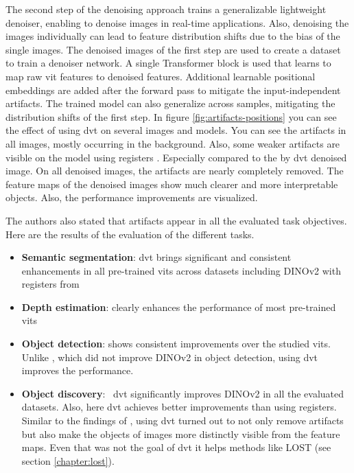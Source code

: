 \documentclass[conference]{IEEEtran}
\begin{document}
  The second step of the denoising approach trains a generalizable lightweight denoiser, enabling to denoise images in real-time applications. Also, denoising the images individually can lead to feature distribution shifts due to the bias of the single images. The denoised images of the first step are used to create a dataset to train a denoiser network. A single Transformer block is used that learns to map raw \ac{vit} features to denoised features. Additional learnable positional embeddings are added after the forward pass to mitigate the input-independent artifacts. The trained model can also generalize across samples, mitigating the distribution shifts of the first step. In figure \ref{fig:artifacts-positions} you can see the effect of using \ac{dvt} on several images and models. You can see the artifacts in all images, mostly occurring in the background. Also, some weaker artifacts are visible on the model using registers \cite{registers}. Especially compared to the by \ac{dvt} denoised image. On all denoised images, the artifacts are nearly completely removed. The feature maps of the denoised images show much clearer and more interpretable objects. Also, the performance improvements are visualized. \cite{denoising}
 
  The authors also stated that artifacts appear in all the evaluated task objectives. Here are the results of the evaluation of the different tasks.
  \begin{itemize}
    \item \textbf{Semantic segmentation}: \ac{dvt} brings significant and consistent
    enhancements in all pre-trained \acp{vit} across datasets including \mbox{DINOv2} with registers from \cite{registers}
    \item \textbf{Depth estimation}: clearly enhances the performance of most pre-trained \acp{vit}
    \item \textbf{Object detection}: shows consistent improvements over the studied \acp{vit}. Unlike \cite{registers}, which did not improve \mbox{DINOv2} in object detection, using \ac{dvt} improves the performance.
    \item \textbf{Object discovery}:  \ac{dvt} significantly improves
    \mbox{DINOv2} in all the evaluated datasets. Also, here \ac{dvt} achieves better improvements than \cite{registers} using registers. Similar to the findings of \cite{registers}, using \ac{dvt} turned out to not only remove artifacts but also make the objects of images more distinctly visible from the feature maps. Even that was not the goal of \ac{dvt} it helps methods like \mbox{LOST} (see section \ref{chapter:lost}). \cite{denoising}
  \end{itemize}
\end{document}
